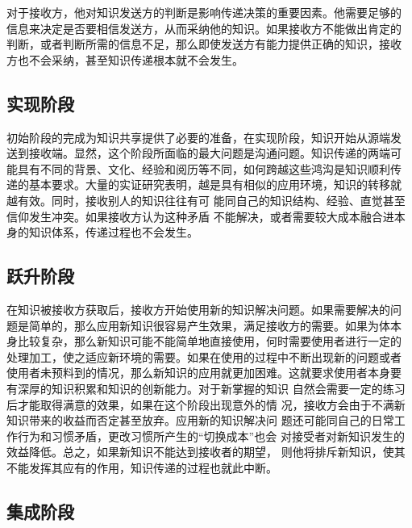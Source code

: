 \documentclass[12pt,a4paper]{ctexart}
\begin{document}
对于接收方，他对知识发送方的判断是影响传递决策的重要因素。他需要足够的
信息来决定是否要相信发送方，从而采纳他的知识。如果接收方不能做出肯定的
判断，或者判断所需的信息不足，那么即使发送方有能力提供正确的知识，接收
方也不会采纳，甚至知识传递根本就不会发生。

\subsection{实现阶段}
初始阶段的完成为知识共享提供了必要的准备，在实现阶段，知识开始从源端发
送到接收端。显然，这个阶段所面临的最大问题是沟通问题。知识传递的两端可
能具有不同的背景、文化、经验和阅历等不同，如何跨越这些鸿沟是知识顺利传
递的基本要求。大量的实证研究表明，越是具有相似的应用环境，知识的转移就
越有效。同时，接收别人的知识往往有可
能同自己的知识结构、经验、直觉甚至信仰发生冲突。如果接收方认为这种矛盾
不能解决，或者需要较大成本融合进本身的知识体系，传递过程也不会发生。


\subsection{跃升阶段}

在知识被接收方获取后，接收方开始使用新的知识解决问题。如果需要解决的问
题是简单的，那么应用新知识很容易产生效果，满足接收方的需要。如果为体本
身比较复杂，那么新知识可能不能简单地直接使用，何时需要使用者进行一定的
处理加工，使之适应新环境的需要。如果在使用的过程中不断出现新的问题或者
使用者未预料到的情况，那么新知识的应用就更加困难。这就要求使用者本身要
有深厚的知识积累和知识的创新能力。对于新掌握的知识
自然会需要一定的练习后才能取得满意的效果，如果在这个阶段出现意外的情
况，接收方会由于不满新知识带来的收益而否定甚至放弃。应用新的知识解决问
题还可能同自己的日常工作行为和习惯矛盾，更改习惯所产生的“切换成本”也会
对接受者对新知识发生的效益降低。总之，如果新知识不能达到接收者的期望，
则他将排斥新知识，使其不能发挥其应有的作用，知识传递的过程也就此中断。

\subsection{集成阶段}
\end{document}
